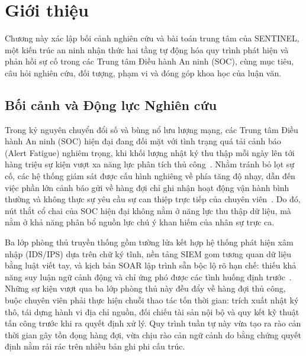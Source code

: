 \chapter{Giới thiệu}
\label{ch:introduction}

Chương này xác lập bối cảnh nghiên cứu và bài toán trung tâm của SENTINEL, một kiến trúc an ninh nhận thức hai tầng tự động hóa quy trình phát hiện và phản hồi sự cố trong các Trung tâm Điều hành An ninh (SOC), cùng mục tiêu, câu hỏi nghiên cứu, đối tượng, phạm vi và đóng góp khoa học của luận văn.

\section{Bối cảnh và Động lực Nghiên cứu}

Trong kỷ nguyên chuyển đổi số và bùng nổ lưu lượng mạng, các Trung tâm Điều hành An ninh (SOC) hiện đại đang đối mặt với tình trạng quá tải cảnh báo (Alert Fatigue) nghiêm trọng, khi khối lượng nhật ký thu thập mỗi ngày lên tới hàng triệu sự kiện vượt xa năng lực phân tích thủ công~\cite{siem2021}. Nhằm tránh bỏ lọt sự cố, các hệ thống giám sát được cấu hình nghiêng về phía tăng độ nhạy, dẫn đến việc phần lớn cảnh báo gửi về hàng đợi chỉ ghi nhận hoạt động vận hành bình thường và không thực sự yêu cầu sự can thiệp trực tiếp của chuyên viên~\cite{alertfatigue2022, alahmadi2022}. Do đó, nút thắt cổ chai của SOC hiện đại không nằm ở năng lực thu thập dữ liệu, mà nằm ở khả năng phân bổ nguồn lực chú ý khan hiếm của nhân sự trực ca.

Ba lớp phòng thủ truyền thống gồm tường lửa kết hợp hệ thống phát hiện xâm nhập (IDS/IPS) dựa trên chữ ký tĩnh, nền tảng SIEM gom tương quan dữ liệu bằng luật viết tay, và kịch bản SOAR lập trình sẵn bộc lộ rõ hạn chế: thiếu khả năng suy luận ngữ cảnh động và chỉ ứng phó được các tình huống định trước~\cite{soar2025}. Những sự kiện vượt qua ba lớp phòng thủ này đều đẩy về hàng đợi thủ công, buộc chuyên viên phải thực hiện chuỗi thao tác tốn thời gian: trích xuất nhật ký thô, tái dựng hành vi địa chỉ nguồn, đối chiếu tài sản nội bộ và quy kết kỹ thuật tấn công trước khi ra quyết định xử lý. Quy trình tuần tự này vừa tạo ra rào cản thời gian gây tồn đọng hàng đợi, vừa chịu rào cản ngữ cảnh do bằng chứng quyết định nằm rải rác trên nhiều bản ghi phi cấu trúc.

